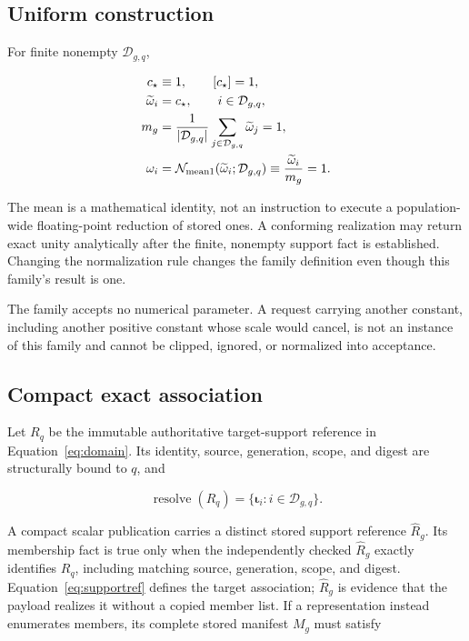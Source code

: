 \subsection{Uniform construction}

For finite nonempty \(\mathcal D_{g,q}\),

\begin{align}
 c_\star &\equiv 1,\qquad [c_\star]=1,\label{eq:constant}\\
 \widetilde\omega_i&=c_\star,\qquad
 i\in\mathcal D_{g,q},\label{eq:raw}\\
 m_g&=\frac{1}{|\mathcal D_{g,q}|}
       \sum_{j\in\mathcal D_{g,q}}\widetilde\omega_j=1,\label{eq:mean}\\
 \omega_i&=\mathcal N_{\rm mean1}
   (\widetilde\omega_i;\mathcal D_{g,q})
   \equiv\frac{\widetilde\omega_i}{m_g}=1.
 \label{eq:normalized}
\end{align}

The mean is a mathematical identity, not an instruction to execute a
population-wide floating-point reduction of stored ones. A conforming
realization may return exact unity analytically after the finite, nonempty
support fact is established. Changing the normalization rule changes the
family definition even though this family's result is one.

The family accepts no numerical parameter. A request carrying another
constant, including another positive constant whose scale would cancel, is
not an instance of this family and cannot be clipped, ignored, or normalized
into acceptance.

\subsection{Compact exact association}

Let \(R_q\) be the immutable authoritative target-support reference in
Equation~\ref{eq:domain}. Its identity, source, generation, scope, and digest
are structurally bound to \(q\), and

\begin{equation}
 \operatorname{resolve}(R_q)
 =\{\boldsymbol\iota_i:i\in\mathcal D_{g,q}\}.
 \label{eq:supportref}
\end{equation}

A compact scalar publication carries a distinct stored support reference
\(\widehat R_g\). Its membership fact is true only when the independently
checked \(\widehat R_g\) exactly identifies \(R_q\), including matching source,
generation, scope, and digest. Equation~\ref{eq:supportref} defines the target
association; \(\widehat R_g\) is evidence that the payload realizes it without
a copied member list. If a representation instead enumerates members, its
complete stored manifest \(M_g\) must satisfy

